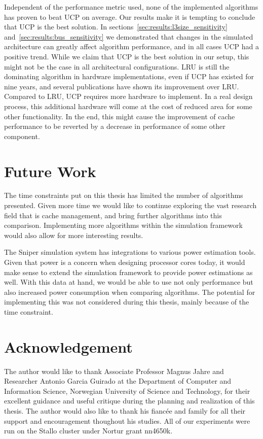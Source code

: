 Independent of the performance metric used, none of the implemented algorithms has proven to beat UCP on average.
Our results make it is tempting to conclude that UCP is the best solution.
In sections~\ref{sec:results:l3size_sensitivity} and~\ref{sec:results:bus_sensitivity} we demonstrated that changes in the simulated architecture can greatly affect algorithm performance, and in all cases UCP had a positive trend.
While we claim that UCP is the best solution in our setup, this might not be the case in all architectural configurations.
LRU is still the dominating algorithm in hardware implementations, even if UCP has existed for nine years, and several publications have shown its improvement over LRU.
Compared to LRU, UCP requires more hardware to implement. 
In a real design process, this additional hardware will come at the cost of reduced area for some other functionality.
In the end, this might cause the improvement of cache performance to be reverted by a decrease in performance of some other component.

\section{Future Work}

The time constraints put on this thesis has limited the number of algorithms presented.
Given more time we would like to continue exploring the vast research field that is cache management, and bring further algorithms into this comparison.
Implementing more algorithms within the simulation framework would also allow for more interesting results.

The Sniper simulation system has integrations to various power estimation tools.
Given that power is a concern when designing processor cores today, it would make sense to extend the simulation framework to provide power estimations as well.
With this data at hand, we would be able to use not only performance but also increased power consumption when comparing algorithms.
The potential for implementing this was not considered during this thesis, mainly because of the time constraint.

\section{Acknowledgement}
The author would like to thank Associate Professor Magnus
Jahre and  Researcher Antonio Garcia Guirado at the Department of Computer and Information Science, Norwegian University of Science and Technology, for their excellent guidance and useful critique during the planning and realization of this thesis.
The author would also like to thank his fiancée and family for all their support and encouragement thoughout his studies.
All of our experiments were run on the Stallo cluster under Nortur grant nn4650k.
